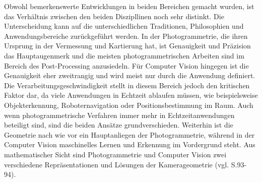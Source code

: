 Obwohl bemerkenswerte Entwicklungen in beiden Bereichen gemacht wurden, ist das Verhältnis zwischen den beiden Diszipllinen noch sehr distinkt. Die Unterscheidung kann auf die unterschiedlichen Traditionen, Philosophien und Anwendungsbereiche zurückgeführt werden. In der Photogrammetrie, die ihren Ursprung in der Vermessung und Kartierung hat, ist Genauigkeit und Präzision das Hauptaugenmerk und die meisten photogrammetrischen Arbeiten sind im Bereich des Post-Processing anzusiedeln. Für Computer Vision hingegen ist die Genauigkeit eher zweitrangig und wird meist nur durch die Anwendung definiert. Die Verarbeitungsgeschwindigkeit stellt in diesem Bereich jedoch den kritischen Faktor dar, da viele Anwendungen in Echtzeit ablaufen müssen, wie beispielsweise Objekterkennung, Roboternavigation oder Positionsbestimmung im Raum. Auch wenn photogrammetrische Verfahren immer mehr in Echtzeitanwendungen beteiligt sind, sind die beiden Ansätze grundverschieden. Weiterhin ist die Geometrie nach wie vor ein Hauptanliegen der Photogrammetrie, während in der Computer Vision maschinelles Lernen und Erkennung im Vordergrund steht. Aus mathematischer Sicht sind Photogrammetrie und Computer Vision zwei verschiedene Repräsentationen und Lösungen der Kamerageometrie (vgl. \cite{ph_vs_cv} S.93-94).

